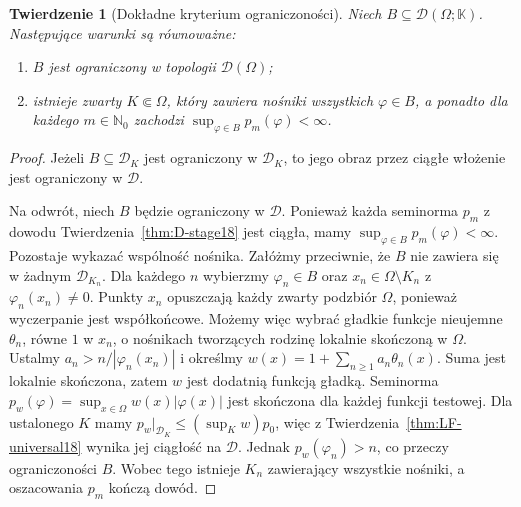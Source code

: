 \documentclass[11pt,a4paper]{article}
\numberwithin{equation}{section}
\theoremstyle{plain}
\newtheorem{twierdzenie}{Twierdzenie}[section]
\theoremstyle{definition}
\theoremstyle{remark}
\newcommand{\N}{\mathbb N}
\newcommand{\K}{\mathbb K}
\begin{document}
\begin{twierdzenie}[Dokładne kryterium ograniczoności]
\label{thm:D-bounded18}
Niech $B\subseteq\mathcal D(\Omega;\K)$. Następujące
warunki są równoważne:
\begin{enumerate}
\item $B$ jest ograniczony w topologii $\mathcal D(\Omega)$;
\item istnieje zwarty $K\Subset\Omega$, który zawiera
nośniki wszystkich $\varphi\in B$, a ponadto dla każdego
$m\in\N_0$ zachodzi $\sup_{\varphi\in B}p_m(\varphi)<\infty$.
\end{enumerate}
\end{twierdzenie}
\begin{proof}
Jeżeli $B\subseteq\mathcal D_K$ jest ograniczony w
$\mathcal D_K$, to jego obraz przez ciągłe włożenie
jest ograniczony w $\mathcal D$.

Na odwrót, niech $B$ będzie ograniczony w $\mathcal D$.
Ponieważ każda seminorma $p_m$ z dowodu
Twierdzenia~\ref{thm:D-stage18} jest ciągła, mamy
$\sup_{\varphi\in B}p_m(\varphi)<\infty$.
Pozostaje wykazać wspólność nośnika. Załóżmy przeciwnie,
że $B$ nie zawiera się w żadnym $\mathcal D_{K_n}$.
Dla każdego $n$ wybierzmy $\varphi_n\in B$ oraz
$x_n\in\Omega\setminus K_n$ z $\varphi_n(x_n)\ne0$.
Punkty $x_n$ opuszczają każdy zwarty podzbiór $\Omega$,
ponieważ wyczerpanie jest współkońcowe. Możemy więc
wybrać gładkie funkcje nieujemne $\theta_n$, równe $1$
w $x_n$, o nośnikach tworzących rodzinę lokalnie skończoną
w $\Omega$. Ustalmy $a_n>n/|\varphi_n(x_n)|$ i określmy
$w(x)=1+\sum_{n\ge1}a_n\theta_n(x)$. Suma jest lokalnie
skończona, zatem $w$ jest dodatnią funkcją gładką.
Seminorma $p_w(\varphi)=\sup_{x\in\Omega}w(x)|\varphi(x)|$
jest skończona dla każdej funkcji testowej. Dla ustalonego
$K$ mamy $p_w|_{\mathcal D_K}\le(\sup_Kw)p_0$, więc
z Twierdzenia~\ref{thm:LF-universal18} wynika jej ciągłość
na $\mathcal D$. Jednak $p_w(\varphi_n)>n$,
co przeczy ograniczoności $B$. Wobec tego istnieje
$K_n$ zawierający wszystkie nośniki, a oszacowania
$p_m$ kończą dowód.
\end{proof}
\end{document}
